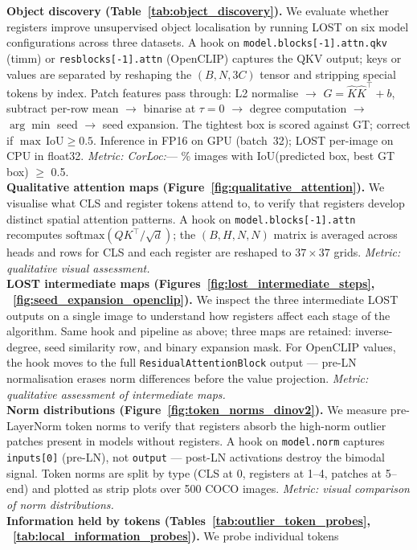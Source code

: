 \textbf{Object discovery (Table~\ref{tab:object_discovery}).} We evaluate whether registers improve unsupervised
object localisation by running LOST on six model configurations across three datasets. A hook on
\texttt{model.blocks[-1].attn.qkv} (timm) or \texttt{resblocks[-1].attn} (OpenCLIP) captures the QKV
output; keys or values are separated by reshaping the $(B,N,3C)$ tensor and stripping special tokens by
index. Patch features pass through: L2 normalise $\to$ $G{=}\hat{K}\hat{K}^\top{+}b$, subtract per-row
mean $\to$ binarise at $\tau{=}0$ $\to$ degree computation $\to$ $\arg\min$ seed $\to$ seed expansion.
The tightest box is scored against GT; correct if $\max\,\text{IoU}{\geq}0.5$. Inference in FP16 on GPU
(batch~32); LOST per-image on CPU in float32. \textit{Metric: CorLoc:}— \% images with IoU(predicted box, best GT box) $\geq$ 0.5.\\
\textbf{Qualitative attention maps (Figure~\ref{fig:qualitative_attention}).} We visualise what CLS and register tokens
attend to, to verify that registers develop distinct spatial attention patterns. A hook on
\texttt{model.blocks[-1].attn} recomputes $\text{softmax}(QK^\top/\sqrt{d})$; the $(B,H,N,N)$ matrix
is averaged across heads and rows for CLS and each register are reshaped to $37{\times}37$ grids.
\textit{Metric: qualitative visual assessment.}\\
\textbf{LOST intermediate maps (Figures~\ref{fig:lost_intermediate_steps}, ~\ref{fig:seed_expansion_openclip}).} We inspect the three
intermediate LOST outputs on a single image to understand how registers affect each stage of the algorithm.
Same hook and pipeline as above; three maps are retained: inverse-degree, seed similarity row, and binary
expansion mask. For OpenCLIP values, the hook moves to the full \texttt{ResidualAttentionBlock} output —
pre-LN normalisation erases norm differences before the value projection.
\textit{Metric: qualitative assessment of intermediate maps.}\\
\textbf{Norm distributions (Figure~\ref{fig:token_norms_dinov2}).} We measure pre-LayerNorm token norms to verify
that registers absorb the high-norm outlier patches present in models without registers. A hook on
\texttt{model.norm} captures \texttt{inputs[0]} (pre-LN), not \texttt{output} — post-LN activations
destroy the bimodal signal. Token norms are split by type (CLS at 0, registers at 1--4, patches at 5--end)
and plotted as strip plots over 500 COCO images. \textit{Metric: visual comparison of norm distributions.}\\
\textbf{Information held by tokens (Tables~\ref{tab:outlier_token_probes}, ~\ref{tab:local_information_probes}).} We probe individual tokens
